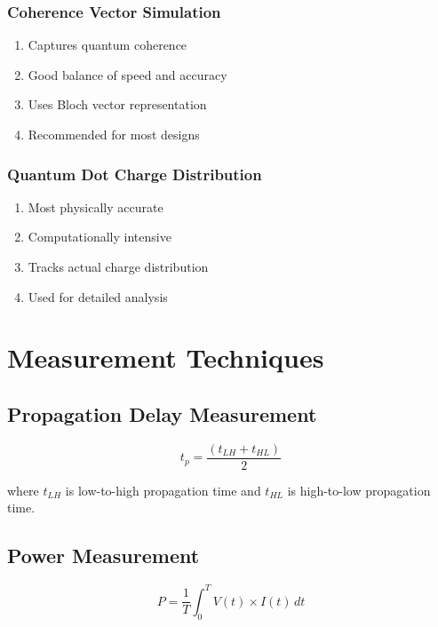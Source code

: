 \documentclass[12pt,a4paper,twoside]{report}
\begin{document}
\begin{appendices}
\subsubsection{Coherence Vector Simulation}

\begin{enumerate}
    \item Captures quantum coherence
    \item Good balance of speed and accuracy
    \item Uses Bloch vector representation
    \item Recommended for most designs
\end{enumerate}

\subsubsection{Quantum Dot Charge Distribution}

\begin{enumerate}
    \item Most physically accurate
    \item Computationally intensive
    \item Tracks actual charge distribution
    \item Used for detailed analysis
\end{enumerate}

\section{Measurement Techniques}

\subsection{Propagation Delay Measurement}

\begin{equation}
t_p = \frac{(t_{LH} + t_{HL})}{2}
\end{equation}

where $t_{LH}$ is low-to-high propagation time and $t_{HL}$ is high-to-low propagation time.

\subsection{Power Measurement}

\begin{equation}
P = \frac{1}{T} \int_0^T V(t) \times I(t) \, dt
\end{equation}


\end{appendices}
\end{document}
